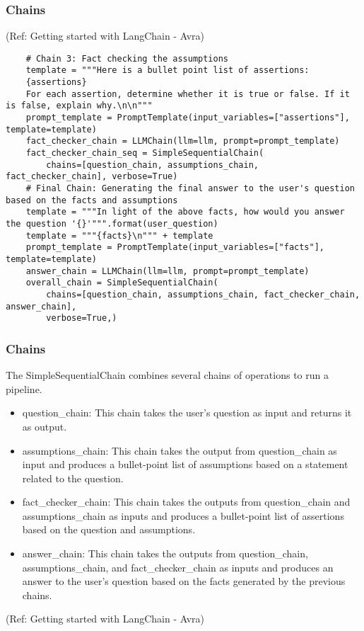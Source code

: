 \begin{frame}[fragile]\frametitle{Chains}

{\tiny (Ref: Getting started with LangChain - Avra)}


\begin{lstlisting}
    # Chain 3: Fact checking the assumptions
    template = """Here is a bullet point list of assertions:
    {assertions}
    For each assertion, determine whether it is true or false. If it is false, explain why.\n\n"""
    prompt_template = PromptTemplate(input_variables=["assertions"], template=template)
    fact_checker_chain = LLMChain(llm=llm, prompt=prompt_template)
    fact_checker_chain_seq = SimpleSequentialChain(
        chains=[question_chain, assumptions_chain, fact_checker_chain], verbose=True)
    # Final Chain: Generating the final answer to the user's question based on the facts and assumptions
    template = """In light of the above facts, how would you answer the question '{}'""".format(user_question)
    template = """{facts}\n""" + template
    prompt_template = PromptTemplate(input_variables=["facts"], template=template)
    answer_chain = LLMChain(llm=llm, prompt=prompt_template)
    overall_chain = SimpleSequentialChain(
        chains=[question_chain, assumptions_chain, fact_checker_chain, answer_chain],
        verbose=True,)
\end{lstlisting}


\end{frame}

\begin{frame}\frametitle{Chains}

The SimpleSequentialChain combines several chains of operations to run a pipeline. 

\begin{itemize}
\item question\_chain: This chain takes the user's question as input and returns it as output. 
\item assumptions\_chain: This chain takes the output from question\_chain as input and produces a bullet-point list of assumptions based on a statement related to the question. 
\item fact\_checker\_chain: This chain takes the outputs from question\_chain and assumptions\_chain as inputs and produces a bullet-point list of assertions based on the question and assumptions.
\item answer\_chain: This chain takes the outputs from question\_chain, assumptions\_chain, and fact\_checker\_chain as inputs and produces an answer to the user's question based on the facts generated by the previous chains.
\end{itemize}


{\tiny (Ref: Getting started with LangChain - Avra)}
\end{frame}


